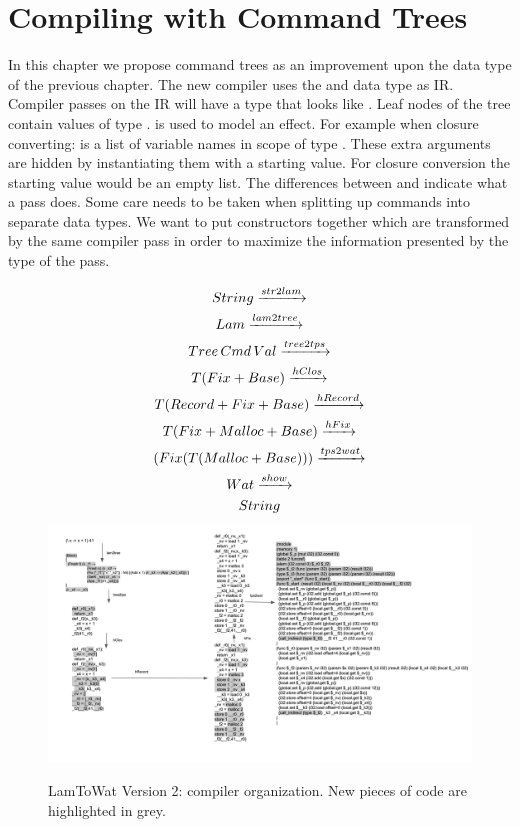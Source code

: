 
\chapter{\label{chap:treecomp}Compiling with Command Trees}

In this chapter we propose command trees as an improvement upon the  data type of the previous chapter. The new compiler uses the  and  data type as IR. Compiler passes on the IR will have a type that looks like . Leaf nodes of the tree contain values of type .  is used to model an effect. For example when closure converting:  is a list of variable names in scope of type \icode{[String]}. These extra arguments are hidden by instantiating them with a starting value. For closure conversion the starting value would be an empty list. The differences between  and  indicate what a pass does. Some care needs to be taken when splitting up commands into separate data types. We want to put constructors together which are transformed by the same compiler pass in order to maximize the information presented by the type of the pass.

\begin{figure}
\begin{gather*}
  String \xrightarrow{str2lam}\\
  Lam \xrightarrow{lam2tree}\\
  Tree \, Cmd \, Val \xrightarrow{tree2tps}\\
  T (Fix + Base) \xrightarrow{hClos}\\
  T (Record + Fix + Base) \xrightarrow{hRecord}\\
  T (Fix + Malloc + Base) \xrightarrow{hFix}\\
  (Fix (T (Malloc + Base))) \xrightarrow{tps2wat}\\
  Wat \xrightarrow{show}\\
  String
\end{gather*}
\includegraphics[width=1\textwidth]{./img/tps.png}
\caption{LamToWat Version 2: compiler organization. New pieces of code are highlighted in grey.}
\label{fig:lam2watv2org}
\end{figure}

